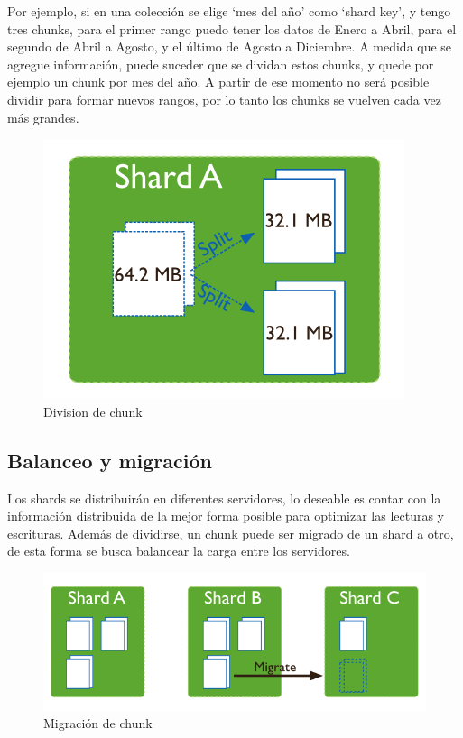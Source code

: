 Por ejemplo, si en una colección se elige `mes del año' como `shard key', y tengo tres
chunks, para el primer rango puedo tener los datos de Enero a Abril, para el segundo de Abril a Agosto, y el último de Agosto a Diciembre.
A medida que se agregue información, puede suceder que se dividan estos chunks, y quede por ejemplo un chunk por mes del año.
A partir de ese momento no será posible dividir para formar nuevos rangos, por lo tanto los chunks se vuelven cada vez más grandes.

\begin{figure}[h!]
 \centering
 \includegraphics[scale=0.5,keepaspectratio=true]{./split-chunk.png}
 \caption{Division de chunk}
\end{figure}

\subsection{Balanceo y migración}

Los shards se distribuirán en diferentes servidores, lo deseable es contar con la información distribuida de la mejor forma
posible para optimizar las lecturas y escrituras. Además de dividirse, un chunk puede ser migrado de un shard a otro, de 
esta forma se busca balancear la carga entre los servidores.


\begin{figure}[h!]
 \centering
 \includegraphics[scale=1,keepaspectratio=true]{./sharding-migrating.png}
 \caption{Migración de chunk}
\end{figure}


